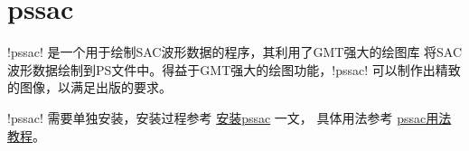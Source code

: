 \section{pssac}
\label{sec:pssac}

!pssac! 是一个用于绘制SAC波形数据的程序，其利用了GMT强大的绘图库
将SAC波形数据绘制到PS文件中。得益于GMT强大的绘图功能，!pssac!
可以制作出精致的图像，以满足出版的要求。

!pssac! 需要单独安装，安装过程参考
\href{http://blog.seisman.info/pssac-install/}{安装pssac} 一文，
具体用法参考 \href{http://blog.seisman.info/pssac-notes/}{pssac用法教程}。
